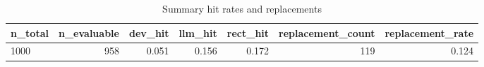 \begin{table}
\caption{Summary hit rates and replacements}
\label{tab:summary}
\begin{tabular}{lrrrrrr}
\toprule
n_total & n_evaluable & dev_hit & llm_hit & rect_hit & replacement_count & replacement_rate \\
\midrule
1000 & 958 & 0.051 & 0.156 & 0.172 & 119 & 0.124 \\
\bottomrule
\end{tabular}
\end{table}
